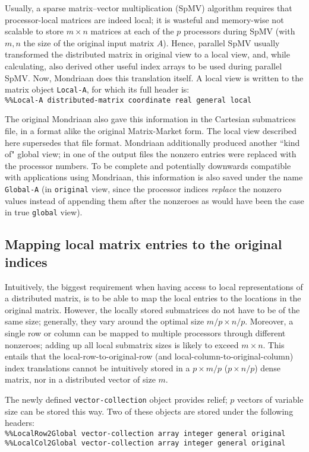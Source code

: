 \documentclass[final]{amsart}
\begin{document}
Usually,
a sparse matrix--vector multiplication (SpMV) algorithm requires that 
processor-local matrices are indeed local;
it is wasteful and memory-wise not scalable to store $m\times n$ matrices
at each of the $p$ processors during SpMV
(with $m,n$ the size of the original input matrix $A$).
Hence, parallel SpMV usually transformed the distributed matrix in original
view to a local view, and, while calculating, also derived other useful
index arrays to be used during parallel SpMV.
Now, Mondriaan does this translation itself. A local view is written to the
matrix object \verb|Local-A|, for which its full header is:\\
\verb|%%Local-A distributed-matrix coordinate real general local|

The original Mondriaan also gave this information in the Cartesian submatrices file,
in a format alike the original Matrix-Market form. The local view described here 
supersedes that file format. Mondriaan additionally produced another ``kind of" global 
view; in one of the output files the nonzero entries were replaced with the processor 
numbers. To be complete and potentially downwards compatible with applications using 
Mondriaan, this information is also saved under the name \verb|Global-A|
(in \verb|original| view, since the processor indices \emph{replace} the nonzero values
instead of appending them after the nonzeroes as would have been the case in true
\verb|global| view).

\subsection{Mapping local matrix entries to the original indices}

Intuitively,
the biggest requirement when having access to local representations of a
distributed matrix, is to be able to map the local entries to the locations
in the original matrix.
However,
the locally stored submatrices do not have to be of the same size;
generally, they vary around the optimal size $m/p\times n/p$.
Moreover,
a single row or column can be mapped to multiple processors through different
nonzeroes;
adding up all local submatrix sizes is likely to exceed $m\times n$.
This entails that the local-row-to-original-row
(and local-column-to-original-column)
index translations cannot be intuitively stored in a $p\times m/p$
($p\times n/p$) dense matrix,
nor in a distributed vector of size $m$.

The newly defined \verb|vector-collection| object provides relief;
$p$ vectors of variable size can be stored this way.
Two of these objects are stored under the following headers:\\
\verb|%%LocalRow2Global vector-collection array integer general original|\\
\verb|%%LocalCol2Global vector-collection array integer general original|
\end{document}

